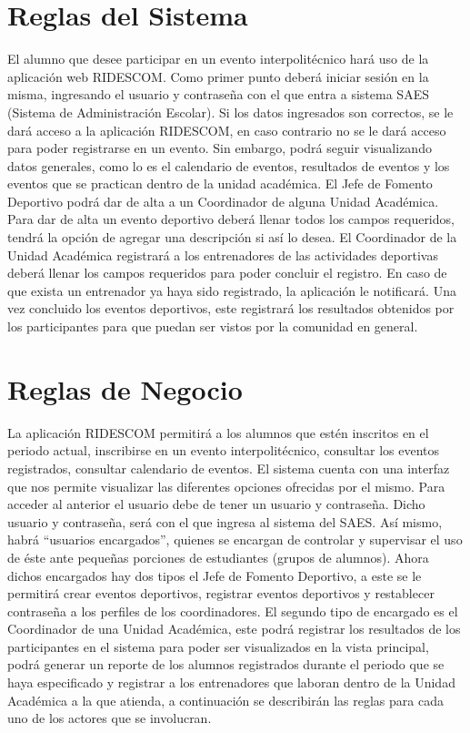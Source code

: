 \section{Reglas del Sistema}
\noindent El alumno que desee participar en un evento interpolitécnico hará uso de la aplicación web RIDESCOM. Como primer punto deberá iniciar sesión en la misma, ingresando el usuario y contraseña con el que entra a sistema SAES (Sistema de Administración Escolar). Si los datos ingresados son correctos, se le dará acceso a la aplicación RIDESCOM, en caso contrario no se le dará acceso para poder registrarse en un evento. Sin embargo, podrá seguir visualizando datos generales, como lo es el calendario de eventos, resultados de eventos y los eventos que se practican dentro de la unidad académica.
El Jefe de Fomento Deportivo podrá dar de alta a un Coordinador de alguna Unidad Académica. Para dar de alta un evento deportivo deberá llenar todos los campos requeridos, tendrá la opción de agregar una descripción si así lo desea. 
El Coordinador de la Unidad Académica registrará a los entrenadores de las actividades deportivas deberá llenar los campos requeridos para poder concluir el registro. En caso de que exista un entrenador ya haya sido registrado, la aplicación le notificará. Una vez concluido los eventos deportivos, este registrará los resultados obtenidos por los participantes para que puedan ser vistos por la comunidad en general. 

\section{Reglas de Negocio}
\noindent La aplicación RIDESCOM permitirá a los alumnos que estén inscritos en el periodo actual, inscribirse en un evento interpolitécnico, consultar los eventos registrados, consultar calendario de eventos. 
El sistema cuenta con una interfaz que nos permite visualizar las diferentes opciones ofrecidas por el mismo. Para acceder al anterior el usuario debe de tener un usuario y contraseña. Dicho usuario y contraseña, será con el que ingresa al sistema del SAES. 
Así mismo, habrá “usuarios encargados”, quienes se encargan de controlar y supervisar el uso de éste ante pequeñas porciones de estudiantes (grupos de alumnos). Ahora dichos encargados hay dos tipos el Jefe de Fomento Deportivo, a este se le permitirá crear eventos deportivos, registrar eventos deportivos y restablecer contraseña a los perfiles de los coordinadores. El segundo tipo de encargado es el Coordinador de una Unidad Académica, este podrá registrar los resultados de los participantes en el sistema para poder ser visualizados en la vista principal, podrá generar un reporte de los alumnos registrados durante el periodo que se haya especificado y registrar a los entrenadores que laboran dentro de la Unidad Académica a la que atienda, a continuación se describirán las reglas para cada uno de los actores que se involucran.


